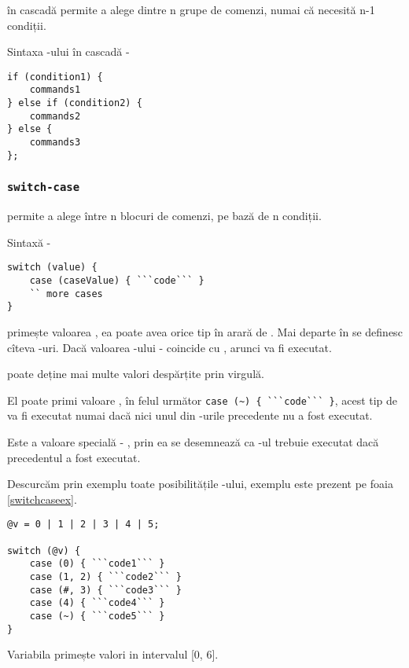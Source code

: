  în cascadă permite a alege dintre n grupe de comenzi, numai că necesită n-1 condiții.

Sintaxa -ului în cascadă -
\begin{lstlisting}[numbers=none]
if (condition1) {
	commands1
} else if (condition2) {
	commands2
} else {
	commands3
};
\end{lstlisting}

\subsubsection{\lstinline|switch-case|}

 permite a alege între n blocuri de comenzi, pe bază de n condiții.

Sintaxă -
\begin{lstlisting}[numbers=none]
switch (value) {
	case (caseValue) { ```code``` }
	`` more cases
}
\end{lstlisting}

 primește valoarea , ea poate avea orice tip în arară de \bool. Mai departe în  se definesc cîteva -uri. Dacă valoarea -ului -  coincide cu , arunci  va fi executat.

 poate deține mai multe valori despărțite prin virgulă.

El poate primi valoare \void, în felul următor \lstinline|case (~) { ```code``` }|, acest tip de  va fi executat numai dacă nici unul din -urile precedente nu a fost executat.

Este a valoare specială - \code{#}, prin ea se desemnează ca -ul trebuie executat dacă precedentul a fost executat.

Descurcăm prin exemplu toate posibilitățile -ului, exemplu este prezent pe foaia \ref{switchcaseex}.

\begin{lstlisting}[caption=Folosirea switch-case-ului, label=switchcaseex]
@v = 0 | 1 | 2 | 3 | 4 | 5;

switch (@v) {
	case (0) { ```code1``` }
	case (1, 2) { ```code2``` }
	case (#, 3) { ```code3``` }
	case (4) { ```code4``` }
	case (~) { ```code5``` }
}
\end{lstlisting}

Variabila  primește valori in intervalul [0, 6].

